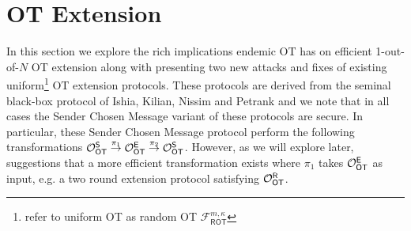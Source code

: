 

\newcommand{\rr}{\ensuremath{\boldsymbol{r}}}
\renewcommand{\tt}{\ensuremath{\boldsymbol{t}}}
\newcommand{\ww}{\ensuremath{\boldsymbol{w}}}
\newcommand{\cc}{\ensuremath{\boldsymbol{c}}}
\newcommand{\uu}{\ensuremath{\boldsymbol{u}}}
\newcommand{\qq}{\ensuremath{\boldsymbol{q}}}
\newcommand{\bb}{\ensuremath{\boldsymbol{b}}}
\newcommand{\vv}{\ensuremath{\boldsymbol{v}}}
\newcommand{\nc}{\ensuremath{{n_\mathcal{C}}}}
\newcommand{\kc}{\ensuremath{{k_\mathcal{C}}}}
\newcommand{\dc}{\ensuremath{{d_\mathcal{C}}}}

\section{OT Extension}


In this section we explore the rich implications endemic OT has on efficient 1-out-of-$N$ OT extension along with presenting two new attacks and fixes of existing uniform\footnote{\cite{C:KelOrsSch15, RSA:OrrOrsSch17} refer to uniform OT as random OT $\mathcal{F}^{m,\kappa}_{\textsf{ROT}}$} OT extension protocols\cite{C:KelOrsSch15, RSA:OrrOrsSch17}. These protocols are derived from the seminal black-box protocol of Ishia, Kilian, Nissim and Petrank\cite{C:IKNP03} and we note that in all cases the Sender Chosen Message variant of these protocols\cite{C:IKNP03, C:KelOrsSch15, RSA:OrrOrsSch17} are secure. In particular, these Sender Chosen Message protocol perform the following transformations $\mathcal{O}_{\mathsf{OT}}^\mathsf{S}\overset{\pi_1}{\rightarrow} \mathcal{O}_{\mathsf{OT}}^\mathsf{E} \overset{\pi_2}{\rightarrow} \mathcal{O}_{\mathsf{OT}}^\mathsf{S}$. However, as we will explore later,  suggestions that a more efficient transformation exists where $\pi_1$ takes $\mathcal{O}_{\mathsf{OT}}^\mathsf{E}$ as input, e.g. a two round extension protocol satisfying $\mathcal{O}_{\mathsf{OT}}^\mathsf{R}$.


